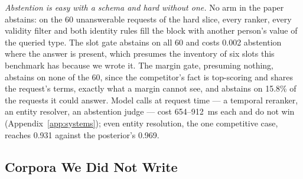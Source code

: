 \documentclass{article} %
\begin{document}
\emph{Abstention is easy with a schema and hard without one.} No arm in the paper abstains: on the 60 unanswerable requests of the hard slice, every ranker, every validity filter and both identity rules fill the block with another person's value of the queried type. The slot gate abstains on all 60 and costs 0.002 abstention where the answer is present, which presumes the inventory of six slots this benchmark has because we wrote it. The margin gate, presuming nothing, abstains on none of the 60, since the competitor's fact is top-scoring and shares the request's terms, exactly what a margin cannot see, and abstains on 15.8\% of the requests it could answer. Model calls at request time --- a temporal reranker, an entity resolver, an abstention judge --- cost 654--912~ms each and do not win (Appendix~\ref{app:systems}); even entity resolution, the one competitive case, reaches 0.931 against the posterior's 0.969.

\subsection{Corpora We Did Not Write}
\label{sec:real}
\end{document}
